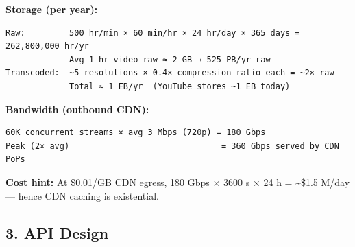 \documentclass[11pt]{article}
\begin{document}
\textbf{Storage (per year):}

\setcodelang{}

\begin{verbatim}
Raw:         500 hr/min × 60 min/hr × 24 hr/day × 365 days = 262,800,000 hr/yr
             Avg 1 hr video raw ≈ 2 GB → 525 PB/yr raw
Transcoded:  ~5 resolutions × 0.4× compression ratio each = ~2× raw
             Total ≈ 1 EB/yr  (YouTube stores ~1 EB today)
\end{verbatim}

\textbf{Bandwidth (outbound CDN):}

\setcodelang{}

\begin{verbatim}
60K concurrent streams × avg 3 Mbps (720p) = 180 Gbps
Peak (2× avg)                               = 360 Gbps served by CDN PoPs
\end{verbatim}

\textbf{Cost hint:} At \$0.01/GB CDN egress, 180 Gbps \(\times\) 3600 s \(\times\) 24 h = \textasciitilde\$1.5 M/day --- hence CDN caching is existential.

\subsection{3. API Design}\label{3-api-design}

\end{document}
